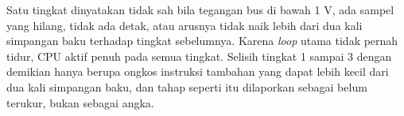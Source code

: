 Satu tingkat dinyatakan tidak sah bila tegangan bus di bawah 1 V, ada sampel yang hilang, tidak ada detak, atau arusnya tidak naik lebih dari dua kali simpangan baku terhadap tingkat sebelumnya. Karena \textit{loop} utama tidak pernah tidur, CPU aktif penuh pada semua tingkat. Selisih tingkat 1 sampai 3 dengan demikian hanya berupa ongkos instruksi tambahan yang dapat lebih kecil dari dua kali simpangan baku, dan tahap seperti itu dilaporkan sebagai belum terukur, bukan sebagai angka.
